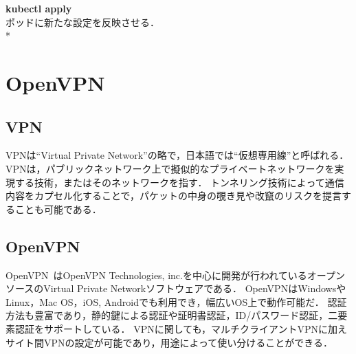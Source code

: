 {\bf kubectl apply}\\
ポッドに新たな設定を反映させる．\\*

\section{OpenVPN}
\label{background:openvpn}

\subsection{VPN}

VPNは``Virtual Private Network''の略で，日本語では``仮想専用線''と呼ばれる．
VPNは，パブリックネットワーク上で擬似的なプライベートネットワークを実現する技術，またはそのネットワークを指す．
トンネリング技術によって通信内容をカプセル化することで，パケットの中身の覗き見や改竄のリスクを提言することも可能である．

\subsection{OpenVPN}

OpenVPN~\cite{OpenVPN}はOpenVPN Technologies, inc.を中心に開発が行われているオープンソースのVirtual Private Networkソフトウェアである．
OpenVPNはWindowsやLinux，Mac OS，iOS, Androidでも利用でき，幅広いOS上で動作可能だ．
認証方法も豊富であり，静的鍵による認証や証明書認証，ID/パスワード認証，二要素認証をサポートしている．
VPNに関しても，マルチクライアントVPNに加えサイト間VPNの設定が可能であり，用途によって使い分けることができる．